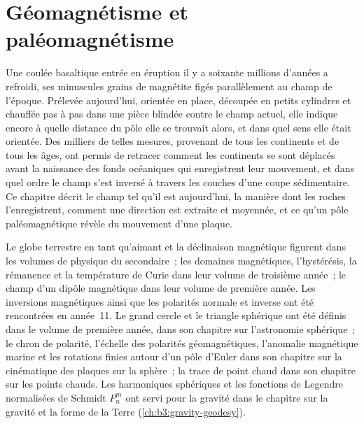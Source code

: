\chapter{Géomagnétisme et paléomagnétisme}\label{ch:b3:palaeomagnetism}

Une coulée basaltique entrée en éruption il y a soixante millions d'années a refroidi, ses minuscules grains de
magnétite figés parallèlement au champ de l'époque. Prélevée aujourd'hui, orientée en
place, découpée en petits cylindres et chauffée
pas à pas dans une pièce blindée contre le champ actuel, elle indique encore à quelle distance
du pôle elle se trouvait alors, et dans quel sens elle était orientée. Des milliers de telles
mesures, provenant de tous les continents et de tous les âges, ont permis de retracer comment les continents
se sont déplacés avant la naissance des fonds océaniques qui enregistrent leur mouvement, et dans
quel ordre le champ s'est inversé à travers les couches d'une
coupe sédimentaire. Ce chapitre décrit le champ tel qu'il est aujourd'hui, la manière dont les roches l'enregistrent,
comment une direction est extraite et moyennée, et ce qu'un pôle paléomagnétique révèle
du mouvement d'une plaque.

\begin{recall}
Le globe terrestre en tant qu'aimant et la déclinaison magnétique figurent dans les volumes de
physique du secondaire~; les domaines magnétiques, l'hystérésis, la rémanence et la température de
Curie dans leur volume de troisième année~; le champ d'un dipôle magnétique dans leur
volume de première année. Les inversions magnétiques ainsi que les polarités normale et inverse ont été
rencontrées en année~11. Le grand cercle et le triangle sphérique ont été définis dans le
volume de première année, dans son chapitre sur l'astronomie sphérique~; le chron de polarité,
l'échelle des polarités géomagnétiques, l'anomalie magnétique marine et les rotations finies
autour d'un pôle d'Euler dans son chapitre sur la cinématique des plaques sur la sphère~;
la trace de point chaud dans son chapitre sur les points chauds. Les harmoniques sphériques et les
fonctions de Legendre normalisées de Schmidt $P_n^m$ ont servi pour la gravité dans le
chapitre sur la gravité et la forme de la Terre (\cref{ch:b3:gravity-geodesy}).
\end{recall}

